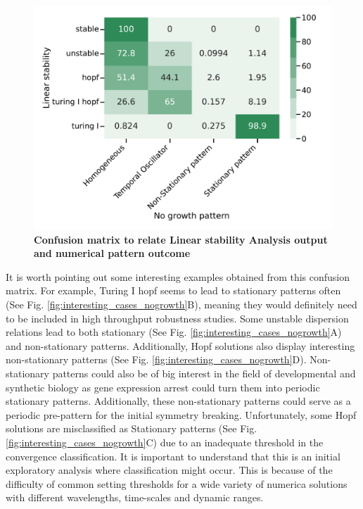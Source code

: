 \begin{figure}[H] %
    \centering
    \includegraphics[width=1\textwidth]{chapters/Chapter 1/lsa_vs_numerical_confusion_variant0-11-12} %
    \caption{\textbf{Confusion matrix to relate Linear stability Analysis output and numerical pattern outcome}}
    \label{fig:lsa_numerical_confusion} %
\end{figure}

It is worth pointing out some interesting examples obtained from this confusion matrix.
For example, Turing I hopf seems to lead to stationary patterns often (See Fig. \ref{fig:interesting_cases_nogrowth}B), meaning they would definitely need to be included in high throughput robustness studies.
Some unstable dispersion relations lead to both stationary (See Fig. \ref{fig:interesting_cases_nogrowth}A) and non-stationary patterns.
Additionally, Hopf solutions also display interesting non-stationary patterns (See Fig. \ref{fig:interesting_cases_nogrowth}D).
Non-stationary patterns could also be of big interest in the field of developmental and synthetic biology as gene expression arrest could turn them into periodic stationary patterns.
Additionally, these non-stationary patterns could serve as a periodic pre-pattern for the initial symmetry breaking.
Unfortunately, some Hopf solutions are misclassified as Stationary patterns (See Fig. \ref{fig:interesting_cases_nogrowth}C) due to an inadequate threshold in the convergence classification.
It is important to understand that this is an initial exploratory analysis where classification might occur.
This is because of the difficulty of common setting thresholds for a wide variety of numerica solutions with different wavelengths, time-scales and dynamic ranges.

